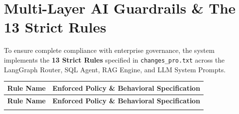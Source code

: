\documentclass[11pt,a4paper]{article}
\begin{document}
\section{Multi-Layer AI Guardrails \& The 13 Strict Rules}

To ensure complete compliance with enterprise governance, the system implements the \textbf{13 Strict Rules} specified in \texttt{changes\_pro.txt} across the LangGraph Router, SQL Agent, RAG Engine, and LLM System Prompts.

\begin{longtable}{p{2.8cm} p{10cm}}
\toprule
\textbf{Rule Name} & \textbf{Enforced Policy \& Behavioral Specification} \\
\midrule
\endfirsthead
\toprule
\textbf{Rule Name} & \textbf{Enforced Policy \& Behavioral Specification} \\
\midrule
\endhead
\bottomrule
\endfoot


\end{longtable}
\end{document}
